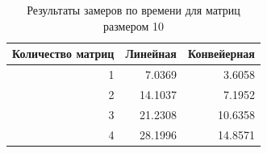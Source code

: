 \begin{table}[H]
	\begin{center}
		\centering
		\captionsetup{skip=0pt,justification=raggedright,singlelinecheck=off}
		\caption{Результаты замеров по времени для матриц размером 10}
		\label{tbl:time4}
		\begin{tabular}{|r|r|r|}
			\hline
			Количество матриц & Линейная & Конвейерная\\
			\hline
			1 & 7.0369 & 3.6058 \\
			\hline
			2 & 14.1037 & 7.1952 \\
			\hline
			3 & 21.2308 & 10.6358 \\
			\hline
			4 & 28.1996 & 14.8571 \\
			\hline
		\end{tabular}
	\end{center}
\end{table}